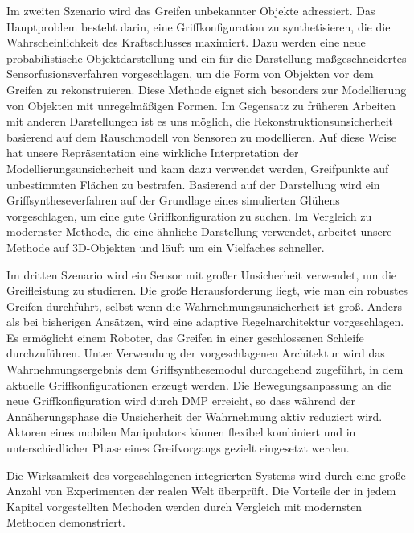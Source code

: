 Im zweiten Szenario wird das Greifen unbekannter Objekte adressiert. Das Hauptproblem besteht darin, eine Griffkonfiguration zu synthetisieren, die die Wahrscheinlichkeit des Kraftschlusses maximiert. Dazu werden eine neue probabilistische Objektdarstellung und ein f\"ur die Darstellung ma{\ss}geschneidertes Sensorfusionsverfahren vorgeschlagen, um die Form von Objekten vor dem Greifen zu rekonstruieren. Diese Methode eignet sich besonders zur Modellierung von Objekten mit unregelm\"a{\ss}igen Formen. Im Gegensatz zu fr\"uheren Arbeiten mit anderen Darstellungen ist es uns m\"oglich, die Rekonstruktionsunsicherheit basierend auf dem Rauschmodell von Sensoren zu modellieren. Auf diese Weise hat unsere Repr\"asentation eine wirkliche Interpretation der Modellierungsunsicherheit und kann dazu verwendet werden, Greifpunkte auf unbestimmten Fl\"achen zu bestrafen. Basierend auf der Darstellung wird ein Griffsyntheseverfahren auf der Grundlage eines simulierten Gl\"uhens vorgeschlagen, um eine gute Griffkonfiguration zu suchen. Im Vergleich zu modernster Methode, die eine \"ahnliche Darstellung verwendet, arbeitet unsere Methode auf 3D-Objekten und l\"auft um ein Vielfaches schneller.

Im dritten Szenario wird ein Sensor mit gro{\ss}er Unsicherheit verwendet, um die Greifleistung zu studieren. Die gro{\ss}e Herausforderung liegt, wie man ein robustes Greifen durchf\"uhrt, selbst wenn  die Wahrnehmungsunsicherheit ist gro{\ss}. Anders als bei bisherigen Ans\"atzen, wird eine adaptive Regelnarchitektur vorgeschlagen. Es erm\"oglicht einem Roboter, das Greifen in einer geschlossenen Schleife durchzuf\"uhren. Unter Verwendung der vorgeschlagenen Architektur wird das Wahrnehmungsergebnis dem Griffsynthesemodul durchgehend zugef\"uhrt, in dem aktuelle Griffkonfigurationen erzeugt werden. Die Bewegungsanpassung an die neue Griffkonfiguration wird durch DMP erreicht, so dass w\"ahrend der Ann\"aherungsphase die Unsicherheit der Wahrnehmung aktiv reduziert wird. Aktoren eines mobilen Manipulators k\"onnen flexibel kombiniert und in unterschiedlicher Phase eines Greifvorgangs gezielt eingesetzt werden.

Die Wirksamkeit des vorgeschlagenen integrierten Systems wird durch eine gro{\ss}e Anzahl von Experimenten der realen Welt \"uberpr\"uft. Die Vorteile der in jedem Kapitel vorgestellten Methoden werden durch Vergleich mit modernsten Methoden demonstriert.


